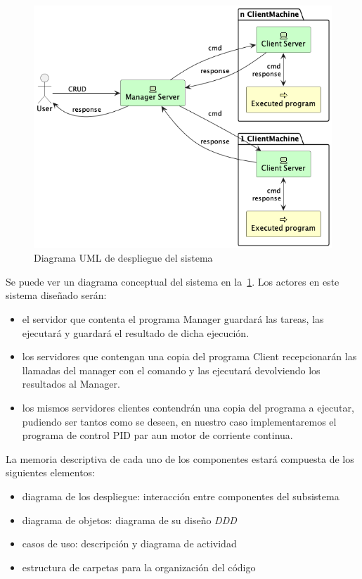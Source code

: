 \begin{figure}[H]
    \centering
    \includegraphics[height=0.4\textheight]{./part/Proyecto_ejecutivo/memoria_descriptiva/descripcionDelProyecto/manager/uml/systemConcept}
    \caption{Diagrama UML de despliegue del sistema}\label{fig:Diagrama UML de despliegue del sistema}
\end{figure}

Se puede ver un diagrama conceptual del sistema en la~\cref{fig:Diagrama UML de despliegue del sistema}. Los actores en este sistema diseñado serán:
\begin{itemize}
    \item el servidor que contenta el programa \gls{Manager} guardará las tareas, las ejecutará y guardará el resultado de dicha ejecución.
    \item los servidores que contengan una copia del programa \gls{Client} recepcionarán las llamadas del manager con el comando y las ejecutará devolviendo los resultados al Manager.
    \item los mismos servidores clientes contendrán una copia del programa a ejecutar, pudiendo ser tantos como se deseen, en nuestro caso implementaremos el programa de control PID par aun motor de corriente continua.
\end{itemize}

La memoria descriptiva de cada uno de los componentes estará compuesta de los siguientes elementos:

\begin{itemize}
    \item diagrama de los despliegue: interacción entre componentes del subsistema
    \item diagrama de objetos: diagrama de su diseño \textit{DDD}
    \item casos de uso: descripción y diagrama de actividad
    \item estructura de carpetas para la organización del código
\end{itemize}

